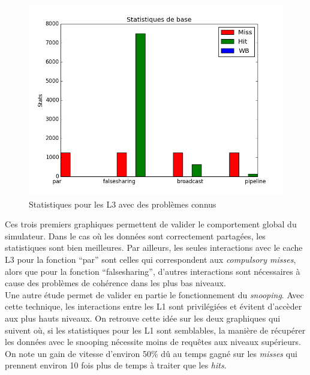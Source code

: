 \begin{figure}[H]
\begin{center}
   \includegraphics[scale=0.35]{images/stats_L3.png}
   \caption{\label{img:inclusifs3} Statistiques pour les L3 avec des problèmes connus}
\end{center}
\end{figure}

Ces trois premiers graphiques permettent de valider le comportement global du simulateur. Dans le cas où les données sont correctement partagées, les statistiques sont bien meilleures. Par ailleurs, les seules interactions avec le cache L3 pour la fonction ``par'' sont celles qui correspondent aux \emph{compulsory misses}, alors que pour la fonction ``falsesharing'', d'autres interactions sont nécessaires à cause des problèmes de cohérence dans les plus bas niveaux. \\

Une autre étude permet de valider en partie le fonctionnement du \emph{snooping}. Avec cette technique, les interactions entre les L1 sont privilégiées et évitent d'accèder aux plus hauts niveaux. On retrouve cette idée sur les deux graphiques qui suivent où, si les statistiques pour les L1 sont semblables, la manière de récupérer les données avec le snooping nécessite moins de requêtes aux niveaux supérieurs. On note un gain de vitesse d'environ 50\% dû au temps gagné sur les \emph{misses} qui prennent environ 10 fois plus de temps à traiter que les \emph{hits}.\\

